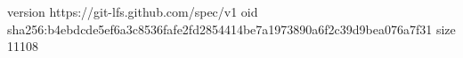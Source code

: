 version https://git-lfs.github.com/spec/v1
oid sha256:b4ebdcde5ef6a3c8536fafe2fd2854414be7a1973890a6f2c39d9bea076a7f31
size 11108
